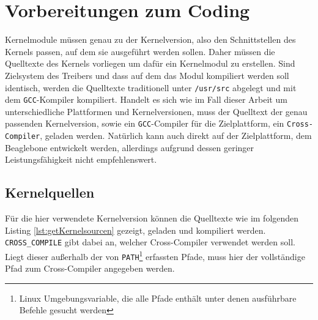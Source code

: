 \section{Vorbereitungen zum Coding} %
Kernelmodule müssen genau zu der Kernelversion, also den Schnittstellen des Kernels passen, auf dem sie ausgeführt werden sollen. Daher müssen die Quelltexte des Kernels vorliegen um dafür ein Kernelmodul zu erstellen. Sind Zielsystem des Treibers und dass auf dem das Modul kompiliert werden soll identisch, werden die Quelltexte traditionell unter \texttt{/usr/src} abgelegt und mit dem \texttt{GCC}-Kompiler kompiliert.
Handelt es sich wie im Fall dieser Arbeit um unterschiedliche Plattformen und Kernelversionen, muss der Quelltext der genau passenden Kernelversion, sowie ein \texttt{GCC}-Compiler für die Zielplattform, ein \texttt{Cross-Compiler}, geladen werden. Natürlich kann auch direkt auf der Zielplattform, dem Beaglebone entwickelt werden, allerdings aufgrund dessen geringer Leistungsfähigkeit nicht empfehlenswert.

\subsection{Kernelquellen}
Für die hier verwendete Kernelversion können die Quelltexte wie im folgenden Listing \ref{lst:getKernelsourcen} gezeigt, geladen und kompiliert werden. \texttt{CROSS\_COMPILE} gibt dabei an, welcher Cross-Compiler verwendet werden soll. Liegt dieser außerhalb der von \texttt{PATH}\footnote{Linux Umgebungsvariable, die alle Pfade enthält unter denen ausführbare Befehle gesucht werden} erfassten Pfade, muss hier der vollständige Pfad zum Cross-Compiler angegeben werden.


